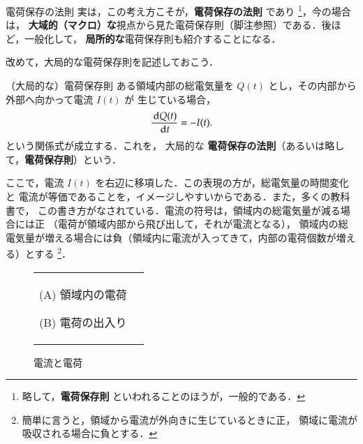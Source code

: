         \begin{mysmallsec}{電荷保存の法則}
        実は，この考え方こそが，\textbf{電荷保存の法則} であり
            \footnote{
                略して，\textbf{電荷保存則} といわれることのほうが，一般的である．
            }，今の場合は，
        \textbf{大域的（マクロ）な}視点から見た電荷保存則（脚注参照）である．後ほど，一般化して，
        \textbf{局所的な}電荷保存則も紹介することになる．

        改めて，大局的な電荷保存則を記述しておこう．
            \begin{myshadebox}{（大局的な）電荷保存則}
                ある領域内部の総電気量を $Q(t)$ とし，その内部から外部へ向かって電流 $I(t)$ が
                生じている場合，
                \begin{align}
                    \frac{\,\mathrm{d} Q(t)}{\,\mathrm{d} t} = - I(t).
                \end{align}
                という関係式が成立する．これを，
                大局的な \textbf{電荷保存の法則}（あるいは略して，\textbf{電荷保存則}）という．
            \end{myshadebox}

        ここで，電流 $I(t)$ を右辺に移項した．この表現の方が，総電気量の時間変化と
        電流が等価であることを，イメージしやすいからである．また，多くの教科書で，
        この書き方がなされている．電流の符号は，領域内の総電気量が減る場合には正
        （電荷が領域内部から飛び出して，それが電流となる），
        領域内の総電気量が増える場合には負（領域内に電流が入ってきて，内部の電荷個数が増える）とする
            \footnote{
                簡単に言うと，領域から電流が外向きに生じているときに正，
                領域に電流が吸収される場合に負とする．
            }．
        \end{mysmallsec}
                \begin{figure}[hbt]
                    \begin{tabular}{cc}
                        \begin{minipage}{0.5\hsize}
                            \begin{center}
                                {Denryu_Denka_intoro001.pdf}

                                (A) 領域内の電荷
                            \end{center}
                        \end{minipage}
                        \begin{minipage}{0.5\hsize}
                            \begin{center}
                                {Denryu_Denka_intoro002.pdf}

                                (B) 電荷の出入り
                            \end{center}
                        \end{minipage}
                    \end{tabular}
                        \caption{電流と電荷}
                        \label{fig:Denryu_Denka_intoro}
                \end{figure}

